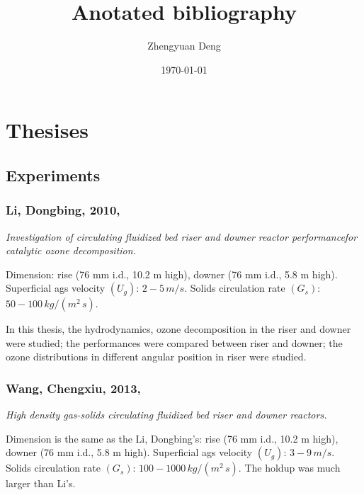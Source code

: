 \documentclass[11pt]{report}
\title{Anotated bibliography}
\author{Zhengyuan Deng}
\date{\today}
\begin{document}
\maketitle

\newpage
\tableofcontents



\chapter{Thesises}
\section{Experiments}
%
%
\subsection[Li, Dongbing, 2010]{Li, Dongbing, 2010, \cite{li2010}}
\textit{Investigation of circulating fluidized bed riser and downer reactor performancefor catalytic ozone decomposition.}

Dimension: rise (76 mm i.d., 10.2 m high), downer (76 mm i.d., 5.8 m high). Superficial ags velocity $(U_g)$: $2-5\,\si{m/s}$. 
Solids circulation rate $(G_s)$: $50-100\,\si{kg/(m^2\,s)}$.

In this thesis, the hydrodynamics, ozone decomposition in the riser and downer were studied; 
the performances were compared between riser and downer; 
the ozone distributions in different angular position in riser were studied.

%
%
\subsection[Wang, Chengxiu, 2013]{Wang, Chengxiu, 2013, \cite{wangcx2013}}
\textit{High density gas-solids circulating fluidized bed riser and downer reactors.}

Dimension is the same as the Li, Dongbing's: rise (76 mm i.d., 10.2 m high), downer (76 mm i.d., 5.8 m high). 
Superficial ags velocity $(U_g)$: $3-9\,\si{m/s}$. 
Solids circulation rate $(G_s)$: $100-1000\,\si{kg/(m^2\,s)}$. 
The holdup was much larger than Li's.
\end{document}
